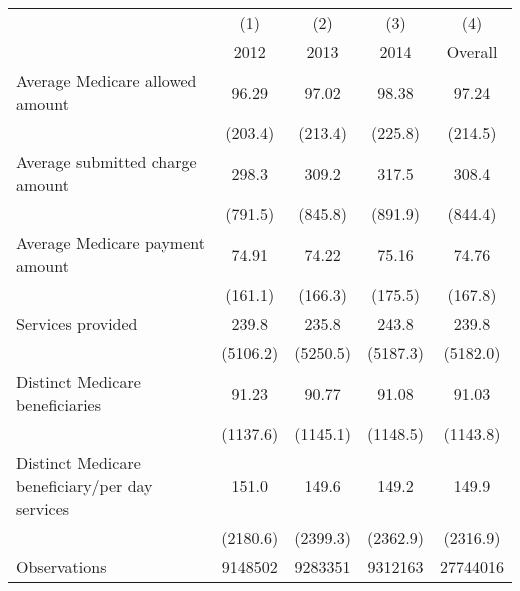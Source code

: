 \def\sym#1{\ifmmode^{#1}\else\(^{#1}\)\fi}
\begin{adjustbox}{max
width={\textwidth},caption={Summary Statistics, Public Use File\label{table:PUFsum}},nofloat=table}
\begin{tabular}{l*{4}{c}}
\toprule
                    &\multicolumn{1}{c}{(1)}&\multicolumn{1}{c}{(2)}&\multicolumn{1}{c}{(3)}&\multicolumn{1}{c}{(4)}\\
                    &\multicolumn{1}{c}{2012}&\multicolumn{1}{c}{2013}&\multicolumn{1}{c}{2014}&\multicolumn{1}{c}{Overall}\\
\midrule
Average Medicare allowed amount&       96.29         &       97.02         &       98.38         &       97.24         \\
                    &     (203.4)         &     (213.4)         &     (225.8)         &     (214.5)         \\
\addlinespace
Average submitted charge amount&       298.3         &       309.2         &       317.5         &       308.4         \\
                    &     (791.5)         &     (845.8)         &     (891.9)         &     (844.4)         \\
\addlinespace
Average Medicare payment amount&       74.91         &       74.22         &       75.16         &       74.76         \\
                    &     (161.1)         &     (166.3)         &     (175.5)         &     (167.8)         \\
\addlinespace
Services provided   &       239.8         &       235.8         &       243.8         &       239.8         \\
                    &    (5106.2)         &    (5250.5)         &    (5187.3)         &    (5182.0)         \\
\addlinespace
Distinct Medicare beneficiaries&       91.23         &       90.77         &       91.08         &       91.03         \\
                    &    (1137.6)         &    (1145.1)         &    (1148.5)         &    (1143.8)         \\
\addlinespace
Distinct Medicare beneficiary/per day services&       151.0         &       149.6         &       149.2         &       149.9         \\
                    &    (2180.6)         &    (2399.3)         &    (2362.9)         &    (2316.9)         \\
\midrule
Observations        &     9148502         &     9283351         &     9312163         &    27744016         \\
\bottomrule
\end{tabular}\end{adjustbox}
